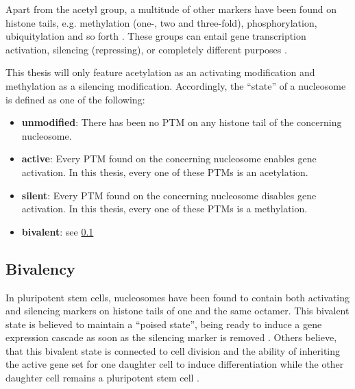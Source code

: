             Apart from the acetyl group, a multitude of other markers have been found on histone tails, e.g. methylation (one-, two and three-fold), phosphorylation, ubiquitylation and so forth \cite{bannister2011regulation}. These groups can entail gene transcription activation, silencing (repressing), or completely different purposes \source. %

            This thesis will only feature acetylation as an activating modification and methylation as a silencing modification. Accordingly, the “state” of a nucleosome is defined as one of the following:

            \begin{itemize}
                \item \textbf{unmodified}: There has been no PTM on any histone tail of the concerning nucleosome.
                \item \textbf{active}: Every PTM found on the concerning nucleosome enables gene activation. In this thesis, every one of these PTMs is an acetylation.
                \item \textbf{silent}: Every PTM found on the concerning nucleosome disables gene activation. In this thesis, every one of these PTMs is a methylation.
                \item \textbf{bivalent}: see \ref{sec:TheoryBivalency}
            \end{itemize}
        \subsection{Bivalency}
            \label{sec:TheoryBivalency}
            In pluripotent stem cells, nucleosomes have been found to contain both activating and silencing markers on histone tails of one and the same octamer. This bivalent state is believed to maintain a “poised state”, being ready to induce a gene expression cascade as soon as the silencing marker is removed \source. %
            Others believe, that this bivalent state is connected to cell division and the ability of inheriting the active gene set for one daughter cell to induce differentiation while the other daughter cell remains a pluripotent stem cell \cite{schuettengruber2017genome}. %
